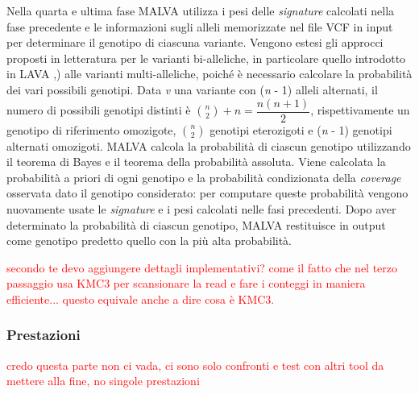 \documentclass[../main.tex]{subfiles}
\begin{document}
Nella quarta e ultima fase MALVA utilizza i pesi delle \textit{signature} calcolati nella fase precedente e le informazioni sugli alleli memorizzate nel file VCF in input per determinare il genotipo di ciascuna variante. Vengono estesi gli approcci proposti in letteratura per le varianti bi-alleliche, in particolare quello introdotto in LAVA \cite{shajii2016lava},) alle varianti multi-alleliche, poiché è necessario calcolare la probabilità dei vari possibili genotipi. Data \textit{v} una variante con (\textit{n} - 1) alleli alternati, il numero di possibili genotipi distinti è $\binom{n}{2} + n = \dfrac{n(n+1)}{2}$, rispettivamente un genotipo di riferimento omozigote, $\binom{n}{2}$ genotipi eterozigoti e (\textit{n} - 1) genotipi alternati omozigoti. MALVA calcola la probabilità di ciascun genotipo utilizzando il teorema di Bayes e il teorema della probabilità assoluta. Viene calcolata la probabilità a priori di ogni genotipo e la probabilità condizionata della \textit{coverage} osservata
dato il genotipo considerato: per computare queste probabilità vengono nuovamente usate le \textit{signature} e i pesi calcolati nelle fasi precedenti. Dopo aver determinato la probabilità di ciascun genotipo, MALVA restituisce in output come genotipo predetto quello con la più alta probabilità.



 \textcolor{red}{ secondo te devo aggiungere dettagli implementativi? come il fatto che nel terzo passaggio usa KMC3 per scansionare la read e fare i conteggi in maniera efficiente... questo equivale anche a dire cosa è KMC3.
 }



\subsubsection{Prestazioni}
 \textcolor{red} {credo questa parte non ci vada, ci sono solo confronti e test con altri tool da mettere alla fine, no singole prestazioni}
 
\end{document}
